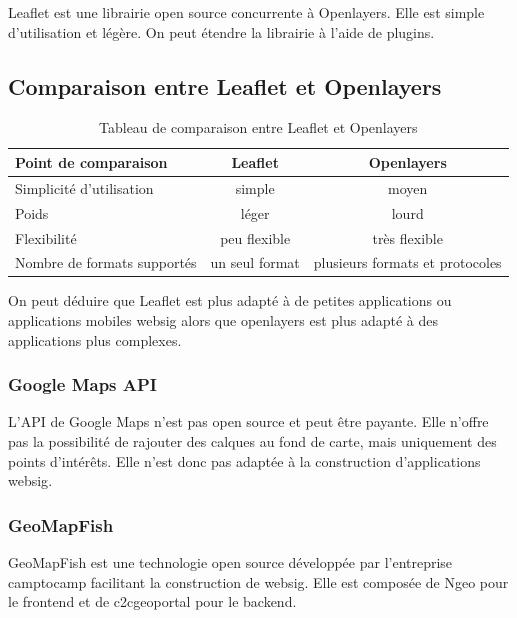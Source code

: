 \documentclass[
    iai, %
    il, %
]{heig-tb}
\begin{document}
Leaflet \cite{leaflet} est une librairie open source concurrente à Openlayers.
Elle est simple d'utilisation et légère.
On peut étendre la librairie à l'aide de plugins.

\subsection{Comparaison entre Leaflet et Openlayers}

\begin{table}[h]
    \begin{center}
        \begin{tabular}{l|c|c}
            Point de comparaison        & Leaflet        & Openlayers                      \\ \hline
            Simplicité d'utilisation    & simple         & moyen                           \\
            Poids                       & léger          & lourd                           \\
            Flexibilité                 & peu flexible   & très flexible                   \\
            Nombre de formats supportés & un seul format & plusieurs formats et protocoles \\
        \end{tabular}
        \caption{Tableau de comparaison entre Leaflet et Openlayers \label{compare}}
    \end{center}
\end{table}

On peut déduire que Leaflet est plus adapté à de petites applications ou applications mobiles \gls{websig} alors que openlayers est plus adapté à des applications plus complexes.

\subsubsection{Google Maps API}
L'API de Google Maps \cite{google-maps} n'est pas open source et peut être payante.
Elle n'offre pas la possibilité de rajouter des calques au fond de carte, mais uniquement des points d'intérêts.
Elle n'est donc pas adaptée à la construction d'applications \gls{websig}.

\subsubsection{GeoMapFish}
GeoMapFish est une technologie open source développée par l'entreprise camptocamp facilitant la construction de \gls{websig}.
Elle est composée de Ngeo pour le frontend \cite{ngeo} et de c2cgeoportal \cite{c2cgeoportal} pour le backend.
\end{document}
